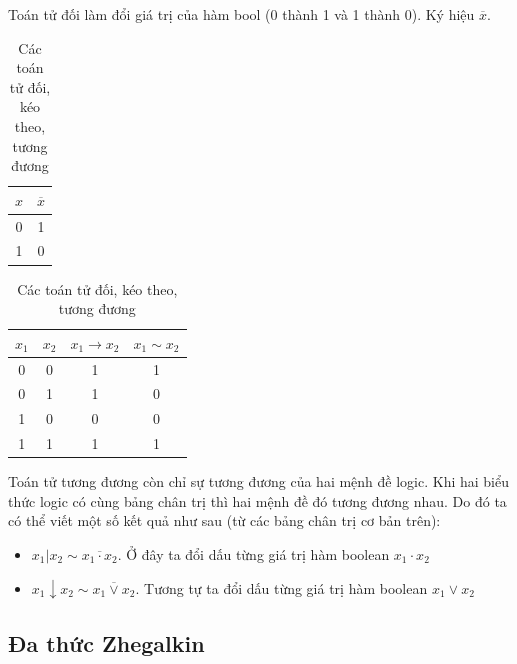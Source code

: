 Toán tử đối làm đổi giá trị của hàm bool (0 thành 1 và 1 thành 0).
Ký hiệu $\overline{x}$.

\begin{table}[ht]
    \begin{subtable}[t]{0.25\textwidth}
        \centering
        \begin{tabular}{|c|c|}
            \hline
            $x$ & $\overline{x}$ \\
            \hline
            0 & 1 \\
            \hline
            1 & 0 \\
            \hline
        \end{tabular}
        \caption{Toán tử đối}
    \end{subtable}
    \hspace{\fill}
    \begin{subtable}[t]{0.55\textwidth}
        \centering
        \begin{tabular}{|c|c|c|c|}
            \hline
            $x_1$ & $x_2$ & $x_1 \rightarrow x_2$ & $x_1 \sim x_2$ \\
            \hline
            0 & 0 & 1 & 1 \\
            \hline
            0 & 1 & 1 & 0 \\
            \hline
            1 & 0 & 0 & 0 \\
            \hline
            1 & 1 & 1 & 1 \\
            \hline
        \end{tabular}
        \caption{Toán tử kéo theo và tương đương}
    \end{subtable}
    \caption{Các toán tử đối, kéo theo, tương đương}
\end{table}

Toán tử tương đương còn chỉ sự tương đương của hai mệnh đề logic.
Khi hai biểu thức logic có cùng bảng chân trị thì hai mệnh đề đó
tương đương nhau. Do đó ta có thể viết một số kết quả như sau (từ
các bảng chân trị cơ bản trên):

\begin{itemize}
    \item $x_1 \vert x_2 \sim \overline{x_1 \cdot x_2}$. Ở đây
        ta đổi dấu từng giá trị hàm boolean $x_1 \cdot x_2$
    \item $x_1 \downarrow x_2 \sim \overline{x_1 \vee x_2}$. 
        Tương tự ta đổi dấu từng giá trị hàm boolean $x_1 \vee x_2$
\end{itemize}

\subsection*{Đa thức Zhegalkin}

